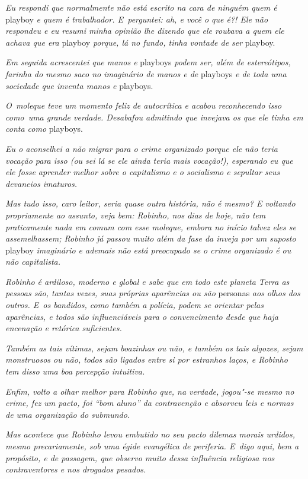 \emph{Eu respondi que normalmente não está escrito na cara de ninguém
quem é} playboy \emph{e quem é trabalhador. E~perguntei: ah, e você o que é?!
Ele não respondeu e eu resumi minha opinião lhe dizendo que ele roubava
a quem ele achava que era} playboy \emph{porque, lá no fundo, tinha vontade de
ser} playboy.

\emph{Em seguida acrescentei que manos e} playboys \emph{podem ser, além de
estereótipos, farinha do mesmo saco no imaginário de manos e de} playboys
\emph{e de toda uma sociedade que inventa manos e} playboys.

\emph{O~moleque teve um momento feliz de autocrítica e acabou
reconhecendo isso como~uma grande verdade. Desabafou admitindo que
invejava os que ele tinha em conta como} playboys.

\emph{Eu o aconselhei a não migrar para o crime organizado porque ele
não teria vocação para isso (ou sei lá se ele ainda teria mais
vocação!), esperando eu que ele fosse aprender melhor sobre o
capitalismo e o socialismo e sepultar seus devaneios imaturos.}

\emph{Mas tudo isso, caro leitor, seria quase outra história, não é
mesmo? E voltando propriamente ao assunto, veja bem: Robinho, nos dias
de hoje, não tem praticamente nada em comum com esse moleque, embora no
início talvez eles se assemelhassem; Robinho já passou muito além da
fase da inveja por um suposto} playboy \emph{imaginário e ademais não está
preocupado se o crime organizado é ou não capitalista.}

\emph{Robinho é ardiloso, moderno e global e sabe que em todo este
planeta Terra as pessoas são, tantas vezes, suas próprias aparências ou
são} personas \emph{aos olhos dos outros. E~os bandidos, como também a polícia,
podem se orientar pelas aparências, e todos são influenciáveis para o
convencimento desde que haja encenação e retórica suficientes.}

\emph{Também as tais vítimas, sejam boazinhas ou não, e também os tais
algozes, sejam monstruosos ou não, todos são ligados entre si por
estranhos laços, e Robinho tem disso uma boa percepção intuitiva.}

\emph{Enfim, volto a olhar melhor para Robinho que, na verdade,
jogou"-se mesmo no crime, fez um pacto, foi ``bom aluno'' da contravenção
e absorveu leis e normas de uma organização do submundo.}

\emph{Mas acontece que Robinho levou embutido no seu pacto dilemas
morais urdidos, mesmo precariamente, sob uma égide evangélica de
periferia. E~digo aqui, bem a propósito, e de passagem, que observo
muito dessa influência religiosa nos contraventores e nos drogados
pesados.}

